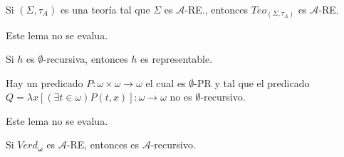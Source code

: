   \begin{lemma} \label{lemma_113}
    \PN Si $(\Sigma, \tau_{A})$ es una teoría tal que $\Sigma$ es $\mathcal{A}$-RE., entonces $Teo_{(\Sigma, \tau_{A})}$
    es $\mathcal{A}$-RE.
  \end{lemma}

  \begin{lemma}
    \PN Este lema no se evalua.
  \end{lemma}

  \begin{proposition} \label{proposition_115}
    \PN Si $h$ es $\emptyset$-recursiva, entonces $h$ es representable.
  \end{proposition}

  \begin{lemma} \label{lemma_116}
    \PN Hay un predicado $P: \omega \times \omega \rightarrow \omega$ el cual es $\emptyset$-PR y tal que el predicado
    \linebreak $Q = \lambda x\left[(\exists t \in \omega) P(t, x)\right]: \omega \rightarrow \omega$ no es
    $\emptyset$-recursivo.
  \end{lemma}

  \begin{lemma}
    \PN Este lema no se evalua.
  \end{lemma}

  \begin{lemma} \label{lemma_118}
    \PN Si $Verd_{\mathbf{\omega}}$ es $\mathcal{A}$-RE, entonces es $\mathcal{A}$-recursivo.
  \end{lemma}

